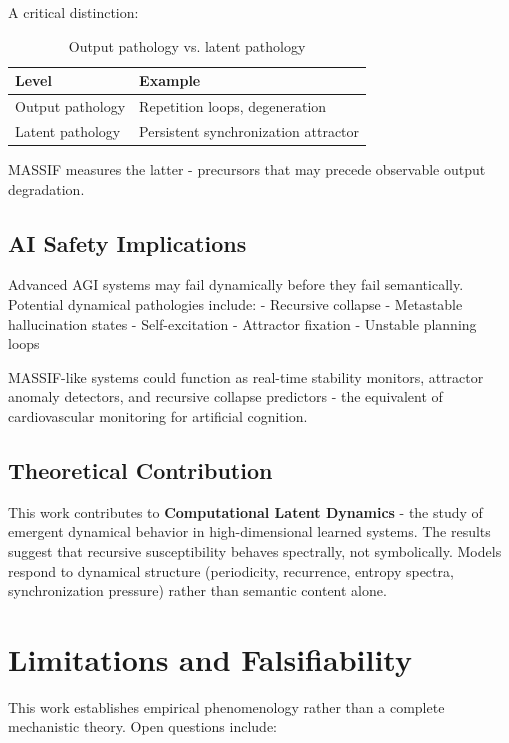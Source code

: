 \documentclass{article}
\begin{document}
A critical distinction:

\begin{table}[H]
\centering
\caption{Output pathology vs. latent pathology}
\label{tab:pathology}
\begin{tabular}{ll}
\toprule
Level & Example \\
\midrule
Output pathology & Repetition loops, degeneration \\
Latent pathology & Persistent synchronization attractor \\
\bottomrule
\end{tabular}
\end{table}

MASSIF measures the latter - precursors that may precede observable output degradation.

\subsection{AI Safety Implications}

Advanced AGI systems may fail dynamically before they fail semantically. Potential dynamical pathologies include:
- Recursive collapse
- Metastable hallucination states
- Self-excitation
- Attractor fixation
- Unstable planning loops

MASSIF-like systems could function as real-time stability monitors, attractor anomaly detectors, and recursive collapse predictors - the equivalent of cardiovascular monitoring for artificial cognition.

\subsection{Theoretical Contribution}

This work contributes to \textbf{Computational Latent Dynamics} - the study of emergent dynamical behavior in high-dimensional learned systems. The results suggest that recursive susceptibility behaves spectrally, not symbolically. Models respond to dynamical structure (periodicity, recurrence, entropy spectra, synchronization pressure) rather than semantic content alone.

\section{Limitations and Falsifiability}

This work establishes empirical phenomenology rather than a complete mechanistic theory. Open questions include:
\end{document}

